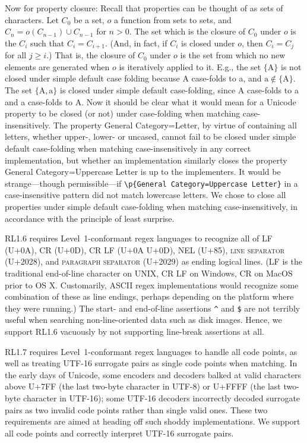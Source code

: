 \documentclass[5p,final,number,sort&compress]{elsarticle}
\newcommand{\re}[1]{\texttt{#1}}
\newcommand*{\whack}{\textbackslash}
\begin{document}
Now for property closure: Recall that properties can be thought of as sets of characters. Let $C_0$ be a set, $o$ a function from sets to sets, and $C_n = o(C_{n-1}) \cup C_{n-1}$ for $n > 0$. The set which is the closure of $C_0$ under $o$ is the $C_i$ such that $C_i = C_{i+1}$. (And, in fact, if $C_i$ is closed under $o$, then $C_i = C_j$ for all $j \ge i$.) That is, the closure of $C_0$ under $o$ is the set from which no new elements are generated when $o$ is iteratively applied to it. E.g., the set $\{\mathrm{A}\}$ is not closed under simple default case folding because A case-folds to a, and $\mathrm{a} \notin \{\mathrm{A}\}$. The set $\{\mathrm{A}, \mathrm{a}\}$ is closed under simple default case-folding, since A case-folds to a and a case-folds to A. Now it should be clear what it would mean for a Unicode property to be closed (or not) under case-folding when matching case-insensitively. The property General Category=Letter, by virtue of containing all letters, whether upper-, lower- or uncased, cannot fail to be closed under simple default case-folding when matching case-insensitively in any correct implementation, but whether an implementation similarly closes the property General Category=Uppercase Letter is up to the implementers. It would be strange---though permissible---if \re{\whack p\{General Category=Uppercase Letter\}} in a case-insensitive pattern did not match lowercase letters. We chose to close all properties under simple default case-folding when matching case-insensitively, in accordance with the principle of least surprise.

RL1.6 requires Level~1-conformant regex languages to recognize all of LF (U+0A), CR (U+0D), CR LF (U+0A U+0D), NEL (U+85), \textsc{line separator} (U+2028), and \textsc{paragraph separator} (U+2029) as ending logical lines. (LF is the traditional end-of-line character on UNIX, CR LF on Windows, CR on MacOS prior to OS X. Customarily, ASCII regex implementations would recognize some combination of these as line endings, perhaps depending on the platform where they were running.) The start- and end-of-line assertions \re{\textasciicircum} and \re{\$} are not terribly useful when searching non-line-oriented data such as disk images. Hence, we support RL1.6 vacuously by not supporting line-break assertions at all.

RL1.7 requires Level~1-conformant regex languages to handle all code points, as well as treating UTF-16 surrogate pairs as single code points when matching. In the early days of Unicode, some encoders and decoders balked at valid characters above U+7FF (the last two-byte character in UTF-8) or U+FFFF (the last two-byte character in UTF-16); some UTF-16 decoders incorrectly decoded surrogate pairs as two invalid code points rather than single valid ones. These two requirements are aimed at heading off such shoddy implementations. We support all code points and correctly interpret UTF-16 surrogate pairs. 
\end{document}
